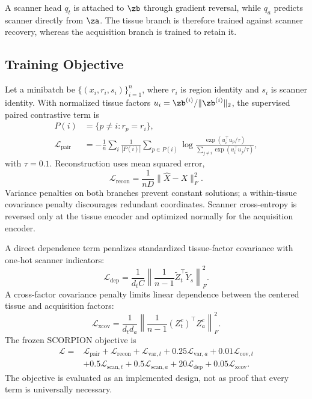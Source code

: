 
A scanner head $q_t$ is attached to $\zb$ through gradient reversal, while $q_a$ predicts scanner directly from $\za$. The tissue branch is therefore trained against scanner recovery, whereas the acquisition branch is trained to retain it.

\subsection{Training Objective}
Let a minibatch be $\{(x_i,r_i,s_i)\}_{i=1}^{n}$, where $r_i$ is region identity and $s_i$ is scanner identity. With normalized tissue factors $u_i=\zb^{(i)}/\lVert\zb^{(i)}\rVert_2$, the supervised paired contrastive term is
\begin{align}
 P(i)&=\{p\ne i:r_p=r_i\},\\
 \mathcal{L}_{\mathrm{pair}}
 &=-\frac{1}{n}\sum_i\frac{1}{|P(i)|}\sum_{p\in P(i)}
 \log\frac{\exp(u_i^\top u_p/\tau)}{\sum_{j\ne i}\exp(u_i^\top u_j/\tau)},
\end{align}
with $\tau=0.1$. Reconstruction uses mean squared error,
\begin{equation}
 \mathcal{L}_{\mathrm{recon}}=\frac{1}{nD}\lVert\widehat{X}-X\rVert_F^2.
\end{equation}
Variance penalties on both branches prevent constant solutions; a within-tissue covariance penalty discourages redundant coordinates. Scanner cross-entropy is reversed only at the tissue encoder and optimized normally for the acquisition encoder.

A direct dependence term penalizes standardized tissue-factor covariance with one-hot scanner indicators:
\begin{equation}
 \mathcal{L}_{\mathrm{dep}}=\frac{1}{d_tC}\left\lVert\frac{1}{n-1}\widetilde Z_t^{\top}\widetilde Y_s\right\rVert_F^2.
\end{equation}
A cross-factor covariance penalty limits linear dependence between the centered tissue and acquisition factors:
\begin{equation}
 \mathcal{L}_{\mathrm{xcov}}=\frac{1}{d_td_a}\left\lVert\frac{1}{n-1}(Z_t^c)^\top Z_a^c\right\rVert_F^2.
\end{equation}
The frozen SCORPION objective is
\begin{align}
\mathcal{L}={}&\mathcal{L}_{\mathrm{pair}}+\mathcal{L}_{\mathrm{recon}}
+\mathcal{L}_{\mathrm{var},t}+0.25\mathcal{L}_{\mathrm{var},a}
+0.01\mathcal{L}_{\mathrm{cov},t}\\
&+0.5\mathcal{L}_{\mathrm{scan},t}+0.5\mathcal{L}_{\mathrm{scan},a}
+20\mathcal{L}_{\mathrm{dep}}+0.05\mathcal{L}_{\mathrm{xcov}}.
\end{align}
The objective is evaluated as an implemented design, not as proof that every term is universally necessary.

